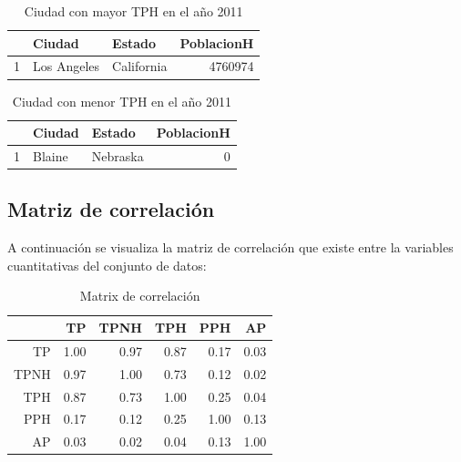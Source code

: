 \begin{table}[ht]
\centering
\begin{tabular}{rllr}
  \hline
 & Ciudad & Estado & PoblacionH \\ 
  \hline
1 & Los Angeles & California & 4760974 \\ 
   \hline
\end{tabular}
\caption{Ciudad con mayor TPH en el año 2011} 
\end{table}


\begin{table}[ht]
\centering
\begin{tabular}{rllr}
  \hline
 & Ciudad & Estado & PoblacionH \\ 
  \hline
1 & Blaine & Nebraska &   0 \\ 
   \hline
\end{tabular}
\caption{Ciudad con menor TPH en el año 2011} 
\end{table}


\subsection{Matriz de correlación}
A continuación se visualiza la matriz de correlación que existe entre la variables cuantitativas del conjunto de datos: 
\begin{table}[ht]
\centering
\begin{tabular}{rrrrrr}
  \hline
 & TP & TPNH & TPH & PPH & AP \\ 
  \hline
TP & 1.00 & 0.97 & 0.87 & 0.17 & 0.03 \\ 
  TPNH & 0.97 & 1.00 & 0.73 & 0.12 & 0.02 \\ 
  TPH & 0.87 & 0.73 & 1.00 & 0.25 & 0.04 \\ 
  PPH & 0.17 & 0.12 & 0.25 & 1.00 & 0.13 \\ 
  AP & 0.03 & 0.02 & 0.04 & 0.13 & 1.00 \\ 
   \hline
\end{tabular}
\caption{Matrix de correlación} 
\end{table}

